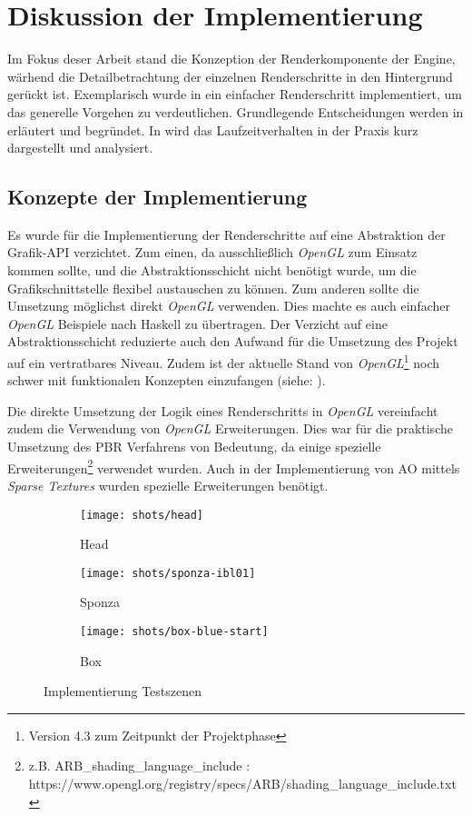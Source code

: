 \section{Diskussion der Implementierung}\label{sec:diskussion-impl}

Im Fokus deser Arbeit stand die Konzeption der Renderkomponente der Engine, wärhend die Detailbetrachtung der einzelnen Renderschritte in den Hintergrund gerückt ist. Exemplarisch wurde in  ein einfacher Renderschritt implementiert, um das generelle Vorgehen zu verdeutlichen. Grundlegende Entscheidungen werden in  erläutert und begründet. In  wird das Laufzeitverhalten in der Praxis kurz dargestellt und analysiert.

\subsection{Konzepte der Implementierung}\label{sec:konzepte-impl}

Es wurde für die Implementierung der Renderschritte auf eine Abstraktion der Grafik-\ac{API} verzichtet. Zum einen, da ausschließlich \textit{OpenGL} zum Einsatz kommen sollte, und die Abstraktionsschicht nicht benötigt wurde, um die Grafikschnittstelle flexibel austauschen zu können. Zum anderen sollte die Umsetzung möglichst direkt \textit{OpenGL} verwenden. Dies machte es auch einfacher \textit{OpenGL} Beispiele nach Haskell zu übertragen. Der Verzicht auf eine Abstraktionsschicht reduzierte auch den Aufwand für die Umsetzung des Projekt auf ein vertratbares Niveau. Zudem ist der aktuelle Stand von \textit{OpenGL}\footnote{Version 4.3 zum Zeitpunkt der Projektphase} noch schwer mit funktionalen Konzepten einzufangen (siehe: ).

Die direkte Umsetzung der Logik eines Renderschritts in \textit{OpenGL} vereinfacht zudem die Verwendung von \textit{OpenGL} Erweiterungen. Dies war für die praktische Umsetzung des \ac{PBR} Verfahrens von Bedeutung, da einige spezielle Erweiterungen\footnote{z.B. ARB\_shading\_language\_include : https://www.opengl.org/registry/specs/ARB/shading\_language\_include.txt} verwendet wurden. Auch in der Implementierung von \acf{AO} mittels \textit{Sparse Textures} wurden spezielle Erweiterungen benötigt.  

\begin{figure}
\centering
\begin{subfigure}{0.3\textwidth}
	\texttt{[image: shots/head]}
	\caption{Head}\label{fig:impl-scenes-head}
\end{subfigure}
\begin{subfigure}{0.3\textwidth}
	\texttt{[image: shots/sponza-ibl01]}
	\caption{Sponza}\label{fig:impl-scenes-sponza}
\end{subfigure}
\begin{subfigure}{0.3\textwidth}
	\texttt{[image: shots/box-blue-start]}
	\caption{Box}\label{fig:impl-scenes-box}
\end{subfigure}
\caption{Implementierung Testszenen}
\end{figure}


